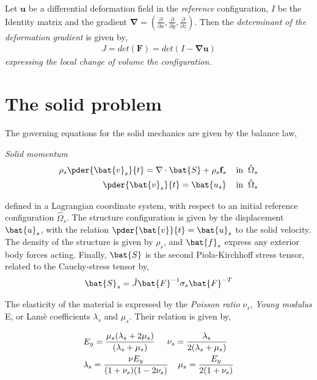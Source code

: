 \begin{defn}
Let $\mathbf{u}$ be a differential deformation field in the \textit{reference} configuration, $I$ be the Identity matrix and
the gradient $\mathbf{\nabla} = (\frac{\partial}{\partial x}, \frac{\partial}{\partial y}, \frac{\partial}{\partial z}) $. Then the \textit{determinant of the deformation gradient} is given by,
\begin{align}
J = det(\mathbf{F}) = det( I - \mathbf{\nabla} \mathbf{u} )
\end{align} 
\textit{expressing the local change of volume the configuration.}
\end{defn}



\section{The solid problem}
\label{sec:solprob}
The governing equations for the solid mechanics are given by the balance law,
\begin{equat}
\textit{Solid momentum}
\begin{align}
\rho_s \pder{\bat{v}_s}{t} = \nabla \cdot \bat{S} + \rho_s \mathbf{f}_s
\hspace{4mm} \text{in} \hspace{2mm} \hat{\Omega}_s \\
\pder{\bat{v}_s}{t} = \bat{u_s} \hspace{4mm} \text{in} \hspace{2mm}  \hat{\Omega}_s
\end{align}
\end{equat}
defined in a Lagrangian coordinate system, with respect to an initial reference configuration $\hat{\Omega}_s$. The structure configuration is given by the displacement $\bat{u}_s$, with the relation $\pder{\bat{v}}{t} = \bat{u}_s$ to the solid velocity. The density of the structure is given by $\rho_s$, and $\bat{f}_s$ express any exterior body forces acting. Finally, $\bat{S}$ is the second Piola-Kirchhoff stress tensor, related to the Cauchy-stress tensor by,
 \begin{align*}
 \bat{S}_s = \hat{J} \bat{F}^{-1} \sigma_s \bat{F}^{-T}
 \end{align*}
 
The elasticity of the material is expressed by the \textit{Poisson ratio} $\nu_s$, \textit{Young modulus} E, or Lamè coefficients  $\lambda_s$ and $\mu_s$. Their relation is given by,

\begin{align*}
&E_y = \frac{ \mu_s ( \lambda_s + 2 \mu_s) }{ ( \lambda_s + \mu_s ) } 
\hspace{5mm} \nu_s = \frac{\lambda_s}{2(\lambda_s + \mu_s)} \\
&\lambda_s = \frac{\nu E_y}{(1 + \nu_s)(1 - 2\nu_s)} \hspace{4mm} \mu_s = \frac{E_y}{2(1 + \nu_s)} 
\end{align*}


